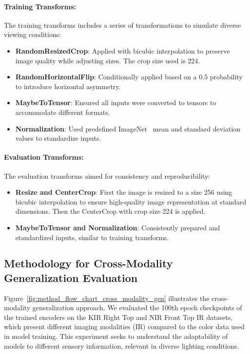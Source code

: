 \paragraph{Training Transforms:}
The training transforms includes a series of transformations to simulate diverse viewing conditions:
\begin{itemize}
    \item \textbf{RandomResizedCrop}: Applied with bicubic interpolation to preserve image quality while adjusting sizes. The crop size used is 224.
    \item \textbf{RandomHorizontalFlip}: Conditionally applied based on a 0.5 probability to introduce horizontal asymmetry.
    \item \textbf{MaybeToTensor}: Ensured all inputs were converted to tensors to accommodate different formats.
    \item \textbf{Normalization}: Used predefined ImageNet~\citep{Imagenet1k_ILSVRC15} mean and standard deviation values to standardize inputs.
\end{itemize}

\paragraph{Evaluation Transforms:}
The evaluation transforms aimed for consistency and reproducibility:
\begin{itemize}
    \item \textbf{Resize and CenterCrop}: First the image is resized to a size 256 using bicubic interpolation to ensure high-quality image representation at standard dimensions. Then the CenterCrop with crop size 224 is applied.
    \item \textbf{MaybeToTensor and Normalization}: Consistently prepared and standardized inputs, similar to training transforms.
\end{itemize}

\subsection{Methodology for Cross-Modality Generalization Evaluation}
\label{section:Methodology for Cross-Modality Generalization Evaluation}
Figure~\ref{fig:method_flow_chart_cross_modality_gen} illustrates the cross-modality generalization approach. We evaluated the 100th epoch checkpoints of the trained encoders on the KIR Right Top and NIR Front Top IR datasets, which present different imaging modalities (IR) compared to the color data used in model training. This experiment seeks to understand the adaptability of models to different sensory information, relevant in diverse lighting conditions.

